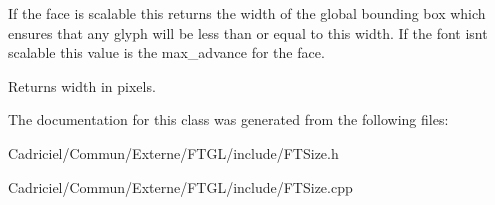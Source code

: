 If the face is scalable this returns the width of the global bounding box which ensures that any glyph will be less than or equal to this width. If the font isn\textquotesingle{}t scalable this value is the max\+\_\+advance for the face.

\begin{DoxyReturn}{Returns}
width in pixels. 
\end{DoxyReturn}


The documentation for this class was generated from the following files\+:\begin{DoxyCompactItemize}
\item 
Cadriciel/\+Commun/\+Externe/\+F\+T\+G\+L/include/F\+T\+Size.\+h\item 
Cadriciel/\+Commun/\+Externe/\+F\+T\+G\+L/include/F\+T\+Size.\+cpp\end{DoxyCompactItemize}
